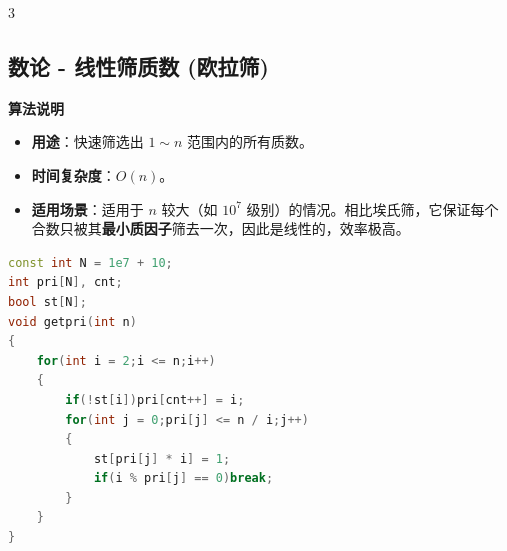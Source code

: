 \documentclass[10pt,landscape,a4paper]{article}
\begin{document}
\begin{multicols*}{3}
\subsection*{数论 - 线性筛质数 (欧拉筛)}
\par\addvspace{0.7ex}\noindent\textbf{算法说明}\par\nobreak
\begin{itemize}
\item \textbf{用途}：快速筛选出 $1 \sim n$ 范围内的所有质数。
\item \textbf{时间复杂度}：$O(n)$。
\item \textbf{适用场景}：适用于 $n$ 较大（如 $10^7$ 级别）的情况。相比埃氏筛，它保证每个合数只被其\textbf{最小质因子}筛去一次，因此是线性的，效率极高。
\end{itemize}
\par{}\par
\begin{lstlisting}[language=C++]
const int N = 1e7 + 10;
int pri[N], cnt;
bool st[N];
void getpri(int n)
{
    for(int i = 2;i <= n;i++)
    {
        if(!st[i])pri[cnt++] = i;
        for(int j = 0;pri[j] <= n / i;j++)
        {
            st[pri[j] * i] = 1;
            if(i % pri[j] == 0)break;
        }
    }
}
\end{lstlisting}

\end{multicols*}
\end{document}
